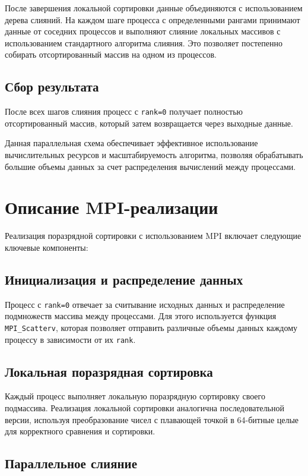 \documentclass[a4paper,12pt]{article}
\begin{document}
После завершения локальной сортировки данные объединяются с использованием дерева слияний. На каждом шаге процесса с определенными рангами принимают данные от соседних процессов и выполняют слияние локальных массивов с использованием стандартного алгоритма слияния. Это позволяет постепенно собирать отсортированный массив на одном из процессов.

\subsection{Сбор результата}

После всех шагов слияния процесс с \texttt{rank=0} получает полностью отсортированный массив, который затем возвращается через выходные данные.

Данная параллельная схема обеспечивает эффективное использование вычислительных ресурсов и масштабируемость алгоритма, позволяя обрабатывать большие объемы данных за счет распределения вычислений между процессами.

\section{Описание MPI-реализации}

Реализация поразрядной сортировки с использованием MPI включает следующие ключевые компоненты:

\subsection{Инициализация и распределение данных}

Процесс с \texttt{rank=0} отвечает за считывание исходных данных и распределение подмножеств массива между процессами. Для этого используется функция \texttt{MPI\_Scatterv}, которая позволяет отправить различные объемы данных каждому процессу в зависимости от их \texttt{rank}.

\subsection{Локальная поразрядная сортировка}

Каждый процесс выполняет локальную поразрядную сортировку своего подмассива. Реализация локальной сортировки аналогична последовательной версии, используя преобразование чисел с плавающей точкой в 64-битные целые для корректного сравнения и сортировки.

\subsection{Параллельное слияние}
\end{document}

